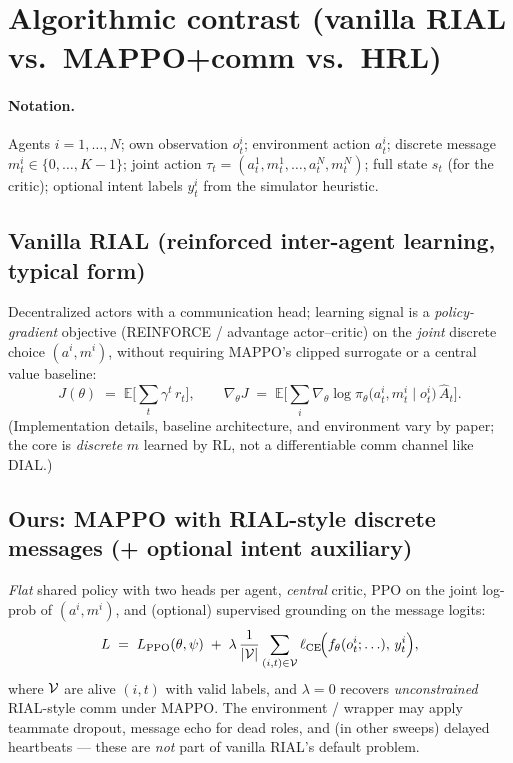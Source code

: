 \documentclass[11pt]{article}
\begin{document}
\section*{Algorithmic contrast (vanilla RIAL vs.\ MAPPO+comm vs.\ HRL)}

\paragraph{Notation.}
Agents $i=1,\ldots,N$; own observation $o^i_t$; environment action $a^i_t$; discrete
message $m^i_t \in \{0,\ldots,K-1\}$; joint action $\tau_t = (a^1_t,m^1_t,\ldots,a^N_t,m^N_t)$;
full state $s_t$ (for the critic); optional intent labels $y^i_t$ from the simulator heuristic.

\subsection*{Vanilla RIAL (reinforced inter-agent learning, typical form)}
Decentralized actors with a communication head; learning signal is a \emph{policy-gradient}
objective (REINFORCE / advantage actor--critic) on the \emph{joint} discrete choice
$(a^i,m^i)$, without requiring MAPPO's clipped surrogate or a central value baseline:
\[
J(\theta) \;=\; \mathbb{E}\Big[\sum_t \gamma^t\, r_t\Big],\qquad
\nabla_\theta J
\;=\;
\mathbb{E}\Big[\sum_i \nabla_\theta \log \pi_\theta\!\big(a^i_t, m^i_t \mid o^i_t\big)\,
\hat A_t\Big].
\]
(Implementation details, baseline architecture, and environment vary by paper; the core is
\emph{discrete} $m$ learned by RL, not a differentiable comm channel like DIAL.)

\subsection*{Ours: MAPPO with RIAL-style discrete messages (+ optional intent auxiliary)}
\emph{Flat} shared policy with two heads per agent, \emph{central} critic, PPO on the
joint log-prob of $(a^i,m^i)$, and (optional) supervised grounding on the message logits:
\[
L \;=\;
L_{\mathrm{PPO}}(\theta,\psi)
\;+\;
\lambda\,\frac{1}{|{\cal V}|} \sum_{(i,t)\in{\cal V}}
\ell_{\mathrm{CE}}\!\Big(f_\theta(o^i_t;\ldots),\, y^i_t\Big),
\]
where ${\cal V}$ are alive $(i,t)$ with valid labels, and $\lambda\!=\!0$ recovers
\emph{unconstrained} RIAL-style comm under MAPPO. The environment / wrapper may apply
teammate dropout, message echo for dead roles, and (in other sweeps) delayed heartbeats
--- these are \emph{not} part of vanilla RIAL's default problem.
\end{document}
